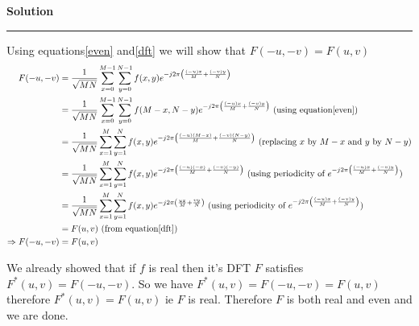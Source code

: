 \documentclass[a4paper]{article}
\newenvironment{solution}[2][]{%
    \begin{mdframed}[linecolor=green!60!black, linewidth=2pt, roundcorner=10pt, backgroundcolor=green!5!white, skipabove=12pt, skipbelow=12pt]%
        \textbf{\large #2} %
        \par\noindent\rule{\textwidth}{0.4pt} %
        \vspace{0.5em} %
}{%
    \end{mdframed}%
}
\begin{document}
\begin{solution}{Solution}
  Using equations\ref{even} and\ref{dft} we will show that $F(-u,-v) = F(u,v)$
  \begin{align}
    F(-u,-v) 
    &= \frac{1}{\sqrt{MN}}\sum\limits_{x = 0}^{M - 1}\sum\limits_{y = 0}^{N - 1} f(x,y) 
    e^{-j2\pi \left(\frac{(-u)x}{M} + \frac{(-v)y}{N}\right)}  \nonumber\\   
    &= \frac{1}{\sqrt{MN}}\sum\limits_{x = 0}^{M - 1}\sum\limits_{y = 0}^{N - 1} f(M - x,N - y) 
    e^{-j2\pi \left(\frac{(-u)x}{M} + \frac{(-v)y}{N}\right)} \text{ (using equation\ref{even})} \nonumber \\
    &= \frac{1}{\sqrt{MN}}\sum\limits_{x = 1}^{M}\sum\limits_{y = 1}^{N} f(x,y) 
    e^{-j2\pi \left(\frac{(-u)(M - x)}{M} + \frac{(-v)(N - y)}{N}\right)}  \text{ (replacing $x$ by $M - x$ and $y$ by $N - y$)}\nonumber \\
    &= \frac{1}{\sqrt{MN}}\sum\limits_{x = 1}^{M}\sum\limits_{y = 1}^{N} f(x,y) 
    e^{-j2\pi \left(\frac{(-u)(-x)}{M} + \frac{(-v)(-y)}{N}\right)}  \text{ (using periodicity of $e^{-j2\pi \left(\frac{(-u)x}{M} + \frac{(-v)y}{N}\right)}$)}\nonumber \\
    &= \frac{1}{\sqrt{MN}}\sum\limits_{x = 1}^{M}\sum\limits_{y = 1}^{N} f(x,y) 
    e^{-j2\pi \left(\frac{ux}{M} + \frac{vy}{N}\right)}  \text{ (using periodicity of $e^{-j2\pi \left(\frac{(-u)x}{M} + \frac{(-v)y}{N}\right)}$)}\nonumber \\
    &= F(u,v) \text{ (from equation\ref{dft})} \nonumber \\
    \Rightarrow F(-u,-v) &= F(u,v)
  \end{align}

  We already showed that if $f$ is real then it's DFT $F$ satisfies $F^{*}(u,v) = F(-u,-v)$. So we have $F^{*}(u,v) = F(-u,-v) = F(u,v)$
  therefore $F^{*}(u,v) = F(u,v)$ ie $F$ is real. Therefore $F$ is both real and even and we are done.
\end{solution}
\end{document}
